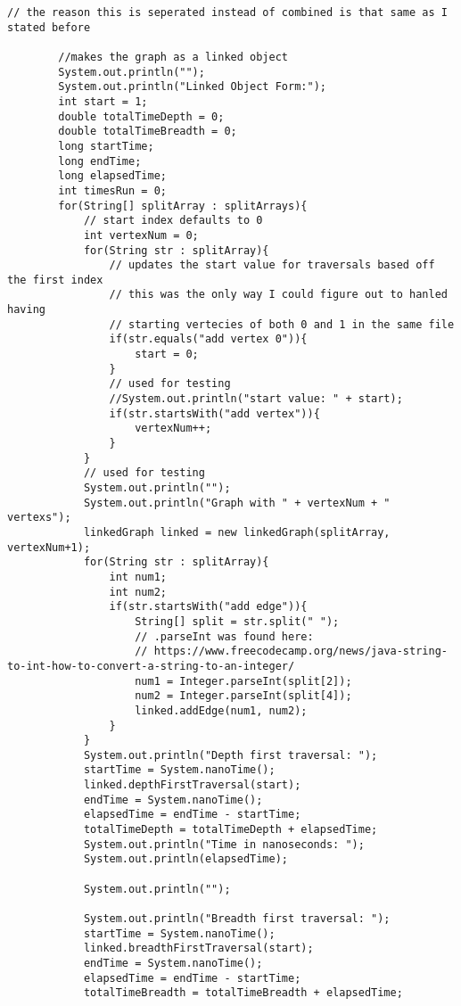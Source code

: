 \documentclass[10pt]{article}
\begin{document}
\begin{lstlisting}[frame=single, ]
        // the reason this is seperated instead of combined is that same as I stated before
        
        //makes the graph as a linked object
        System.out.println("");
        System.out.println("Linked Object Form:");
        int start = 1;
        double totalTimeDepth = 0;
        double totalTimeBreadth = 0;
        long startTime;
        long endTime;
        long elapsedTime;
        int timesRun = 0;
        for(String[] splitArray : splitArrays){
            // start index defaults to 0
            int vertexNum = 0;
            for(String str : splitArray){
                // updates the start value for traversals based off the first index
                // this was the only way I could figure out to hanled having
                // starting vertecies of both 0 and 1 in the same file
                if(str.equals("add vertex 0")){
                    start = 0;
                }
                // used for testing
                //System.out.println("start value: " + start);
                if(str.startsWith("add vertex")){
                    vertexNum++;
                }
            }
            // used for testing
            System.out.println("");
            System.out.println("Graph with " + vertexNum + " vertexs");
            linkedGraph linked = new linkedGraph(splitArray, vertexNum+1);
            for(String str : splitArray){
                int num1;
                int num2;
                if(str.startsWith("add edge")){
                    String[] split = str.split(" ");
                    // .parseInt was found here:
                    // https://www.freecodecamp.org/news/java-string-to-int-how-to-convert-a-string-to-an-integer/
                    num1 = Integer.parseInt(split[2]);
                    num2 = Integer.parseInt(split[4]);
                    linked.addEdge(num1, num2);
                }
            }
            System.out.println("Depth first traversal: ");
            startTime = System.nanoTime();
            linked.depthFirstTraversal(start);
            endTime = System.nanoTime();
            elapsedTime = endTime - startTime;
            totalTimeDepth = totalTimeDepth + elapsedTime;
            System.out.println("Time in nanoseconds: ");
            System.out.println(elapsedTime);

            System.out.println("");

            System.out.println("Breadth first traversal: ");
            startTime = System.nanoTime();
            linked.breadthFirstTraversal(start);
            endTime = System.nanoTime();            
            elapsedTime = endTime - startTime;
            totalTimeBreadth = totalTimeBreadth + elapsedTime;
        

\end{lstlisting}
\end{document}
